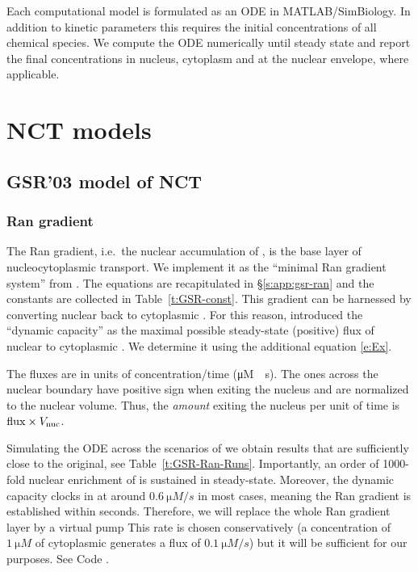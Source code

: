 \documentclass[12pt,notitlepage]{article}
\newcommand{\TEXT}[1]{\quad\text{#1}\quad}
\def\[#1\]{\begin{align}#1\end{align}}
\begin{document}

Each computational model is formulated as an ODE
in MATLAB/SimBiology.
%
In addition to kinetic parameters
this requires the initial concentrations of all chemical species.
%
We compute the ODE numerically until steady state
and report the final concentrations
in nucleus, cytoplasm and at the nuclear envelope, where applicable.



\section{NCT models}

\subsection{GSR'03 model of NCT} \label{s:GSR03}

\subsubsection*{Ran gradient} \label{s:GSR03:Ran}

The Ran gradient,
i.e.~the nuclear accumulation of ,
is the base layer of nucleocytoplasmic transport.
%
%
We implement it as
the ``minimal Ran gradient system'' from 
\cite{GoerlichSeewaldRibbeck2003}.
%
%
The equations are recapitulated in
\S\ref{s:app:gsr-ran}
and
the constants are collected in 
Table~\ref{t:GSR-const}.
%
%
This gradient
can be harnessed
by converting nuclear  back to cytoplasmic .
%
For this reason,
\cite{GoerlichSeewaldRibbeck2003}
introduced
the ``dynamic capacity'' 
as the maximal possible steady-state (positive) flux
of nuclear  to cytoplasmic .
%
We determine it using the additional equation \eqref{e:Ex}.

%

The fluxes 
are in units of concentration/time (\si{\micro M \per s}).
%
The ones across the nuclear boundary
have positive sign when exiting the nucleus
and are normalized to the nuclear volume.
%
Thus,
the \emph{amount} exiting the nucleus per unit of time is
$\ce{flux} \times V_\text{nuc}$.

%

Simulating the ODE
across the scenarios of 
\cite{GoerlichSeewaldRibbeck2003}
we obtain 
results that are sufficiently close
to the original,
see Table~\ref{t:GSR-Ran-Runs}.
%
%
Importantly,
an order of 1000-fold nuclear enrichment of 
is sustained in steady-state.
%
Moreover, the dynamic capacity clocks in at around
$
	\SI{0.6}{\micro M / s}
$
in most cases,
meaning the Ran gradient is established within seconds.
%
%
Therefore,
we will replace the whole Ran gradient layer
by a virtual pump
\[
	\label{e:pump}
	\ce{->}
	\TEXT{with kinetic rate \SI{0.1}{s^{-1}}.}
\]
%
%
This rate is chosen conservatively
(a concentration of $\SI{1}{\micro M}$ of cytoplasmic  generates
a flux of $\SI{0.1}{\micro M / s}$)
but 
it will be
sufficient for our purposes.
%
%
%
See Code .
\end{document}
